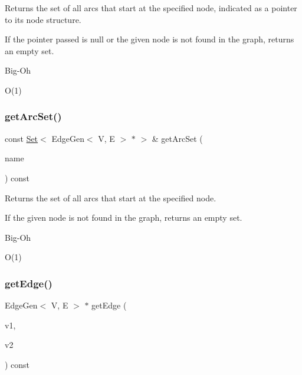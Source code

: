 Returns the set of all arcs that start at the specified node, indicated as a pointer to its node structure. 

If the pointer passed is null or the given node is not found in the graph, returns an empty set. \begin{DoxyRefDesc}{Big-\/\+Oh}
\item[\mbox{\hyperlink{BigOh__BigOh000063}{Big-\/\+Oh}}]O(1) \end{DoxyRefDesc}
\mbox{\label{classGraph_a31b9e2056ee2d66a7ea9feb02f016e8d}} 
\subsubsection{\texorpdfstring{get\+Arc\+Set()}{getArcSet()}\hspace{0.1cm}{\footnotesize\ttfamily [3/3]}}
{\footnotesize\ttfamily const \mbox{\hyperlink{classstanfordcpplib_1_1collections_1_1GenericSet}{Set}}$<$ Edge\+Gen$<$ V, E $>$  $\ast$ $>$ \& get\+Arc\+Set (\begin{DoxyParamCaption}\item[{const std\+::string \&}]{name }\end{DoxyParamCaption}) const\hspace{0.3cm}{\ttfamily [inherited]}}



Returns the set of all arcs that start at the specified node. 

If the given node is not found in the graph, returns an empty set. \begin{DoxyRefDesc}{Big-\/\+Oh}
\item[\mbox{\hyperlink{BigOh__BigOh000064}{Big-\/\+Oh}}]O(1) \end{DoxyRefDesc}
\mbox{\label{classBasicGraphGen_aad31ac511c91ccf23a19af68e7a9f316}} 
\subsubsection{\texorpdfstring{get\+Edge()}{getEdge()}\hspace{0.1cm}{\footnotesize\ttfamily [1/2]}}
{\footnotesize\ttfamily Edge\+Gen$<$ V, E $>$ $\ast$ get\+Edge (\begin{DoxyParamCaption}\item[{\mbox{\hyperlink{classVertexGen}{Vertex\+Gen}}$<$ V, E $>$ $\ast$}]{v1,  }\item[{\mbox{\hyperlink{classVertexGen}{Vertex\+Gen}}$<$ V, E $>$ $\ast$}]{v2 }\end{DoxyParamCaption}) const}



